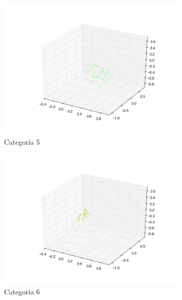 \begin{figure}[H]
\begin{subfigure}[b]{0.33\textwidth}
                \includegraphics[width=\linewidth]{secciones/graficos/sanger/categoria_5.png}
                \caption{Categoría 5}
                \label{fig: ej1_sanger_categoria_5}
        \end{subfigure}
        \begin{subfigure}[b]{0.33\textwidth}
                \includegraphics[width=\linewidth]{secciones/graficos/sanger/categoria_6.png}
                \caption{Categoría 6}
                \label{fig: ej1_sanger_categoria_6}
        \end{subfigure}
        \begin{subfigure}[b]{0.33\textwidth}

\end{subfigure}
\end{figure}
